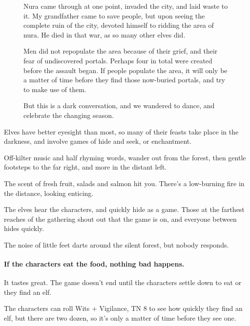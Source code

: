 \begin{multicols}{2}
\begin{figure*}[b]
\begin{speechtext}
	Nura came through at one point, invaded the city, and laid waste to it.  My grandfather came to save people, but upon seeing the complete ruin of the city, devoted himself to ridding the area of nura.  He died in that war, as so many other elves did.

	Men did not repopulate the area because of their grief, and their fear of undiscovered portals.
	Perhaps four in total were created before the assault began.
	If people populate the area, it will only be a matter of time before they find those now-buried portals, and try to make use of them.

	But this is a dark conversation, and we wandered to dance, and celebrate the changing season.

\end{speechtext}
\end{figure*}

Elves have better eyesight than most, so many of their feasts take place in the darkness, and involve games of hide and seek, or enchantment.

\begin{boxtext}

	Off-kilter music and half rhyming words, wander out from the forest, then gentle footsteps to the far right, and more in the distant left.

	The scent of fresh fruit, salads and salmon hit you.  There's a low-burning fire in the distance, looking enticing.

\end{boxtext}

The elves hear the characters, and quickly hide as a game.  Those at the farthest reaches of the gathering shout out that the game is on, and everyone between hides quickly.

\begin{boxtext}

	The noise of little feet darts around the silent forest, but nobody responds.

\end{boxtext}

\paragraph{If the characters eat the food, nothing bad happens.}
It tastes great.
The game doesn't end until the characters settle down to eat or they find an elf.

The characters can roll Wits + Vigilance, TN 8 to see how quickly they find an elf, but there are two dozen, so it's only a matter of time before they see one.


\end{multicols}
